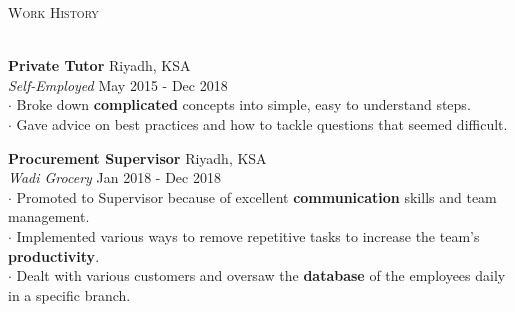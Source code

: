 \documentclass[a4paper]{article}
\newcommand{\lineunder} {
    \vspace*{-8pt} \\
    \hspace*{-18pt} \hrulefill \\
}
\newcommand{\header} [1] {
    {\hspace*{-18pt}\vspace*{6pt} \textsc{#1}}
    \vspace*{-6pt} \lineunder
}
\begin{document}
{\large\header{Work History}}
\vspace{0.6mm}

\textbf{Private Tutor} \hfill Riyadh, KSA\\
\textit{Self-Employed} \hfill May 2015 - Dec 2018\\\vspace*{0.5mm}
$\cdot$ Broke down {\textbf{complicated}} concepts into simple, easy to understand steps.\\
$\cdot$ Gave advice on best practices and how to tackle questions that seemed difficult.
\vspace*{2mm}

\textbf{Procurement Supervisor} \hfill Riyadh, KSA\\
\textit{Wadi Grocery} \hfill Jan 2018 - Dec 2018\\\vspace*{0.5mm}
$\cdot$ Promoted to Supervisor because of excellent {\textbf{communication}} skills and team management.\\
$\cdot$ Implemented various ways to remove repetitive tasks to increase the team’s {\textbf{productivity}}.\\
$\cdot$ Dealt with various customers and oversaw the {\textbf{database}} of the employees daily in a specific branch.
\vspace*{2mm}

\ 
\end{document}
